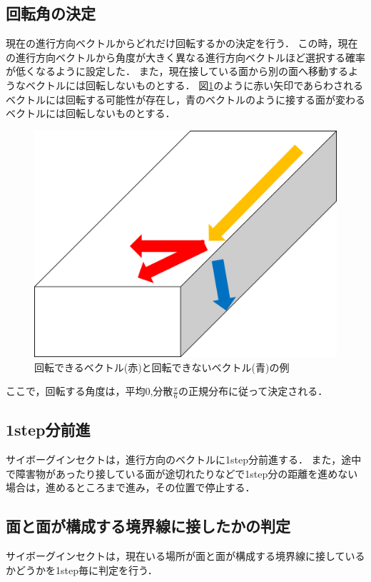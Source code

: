 \documentclass[a4paper,11pt]{jarticle}
\begin{document}
	\subsection{回転角の決定}
	現在の進行方向ベクトルからどれだけ回転するかの決定を行う．
	この時，現在の進行方向ベクトルから角度が大きく異なる進行方向ベクトルほど選択する確率が低くなるように設定した．
	また，現在接している面から別の面へ移動するようなベクトルには回転しないものとする．
	図\ref{fig:bend}のように赤い矢印であらわされるベクトルには回転する可能性が存在し，青のベクトルのように接する面が変わるベクトルには回転しないものとする．
	\begin{figure}
		\centering
		\includegraphics[width=0.35\linewidth]{png/bend.png}
		\caption[ベクトルの決定]{回転できるベクトル(赤)と回転できないベクトル(青)の例}
		\label{fig:bend}
	\end{figure}
	
	ここで，回転する角度は，平均0,分散$\frac{\pi}{6}$の正規分布に従って決定される．
	
	\subsection{1step分前進}
	サイボーグインセクトは，進行方向のベクトルに1step分前進する．
	また，途中で障害物があったり接している面が途切れたりなどで1step分の距離を進めない場合は，進めるところまで進み，その位置で停止する．
	
	\subsection{面と面が構成する境界線に接したかの判定}
	サイボーグインセクトは，現在いる場所が面と面が構成する境界線に接しているかどうかを1step毎に判定を行う．
	
\end{document}
